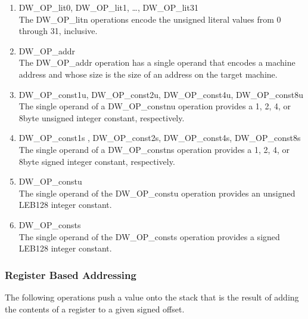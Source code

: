\begin{enumerate}[1]
\item DW\_OP\_lit0, DW\_OP\_lit1, \dots, DW\_OP\_lit31 \\
The DW\_OP\_litn operations encode the unsigned literal values
from 0 through 31, inclusive.

\item DW\_OP\_addr \\
The DW\_OP\_addr operation has a single operand that encodes
a machine address and whose size is the size of an address
on the target machine.

\item DW\_OP\_const1u, DW\_OP\_const2u, DW\_OP\_const4u, DW\_OP\_const8u \\
The single operand of a DW\_OP\_constnu operation provides a 1,
2, 4, or 8\dash byte unsigned integer constant, respectively.

\item DW\_OP\_const1s , DW\_OP\_const2s, DW\_OP\_const4s, DW\_OP\_const8s \\
The single operand of a DW\_OP\_constns operation provides a 1,
2, 4, or 8\dash byte signed integer constant, respectively.

\item DW\_OP\_constu \\
The single operand of the DW\_OP\_constu operation provides
an unsigned LEB128 integer constant.

\item DW\_OP\_consts \\
The single operand of the DW\_OP\_consts operation provides
a signed LEB128 integer constant.

\end{enumerate}


\subsubsection{Register Based Addressing}
\label{chap:registerbasedaddressing}
The following operations push a value onto the stack that is
the result of adding the contents of a register to a given
signed offset.

